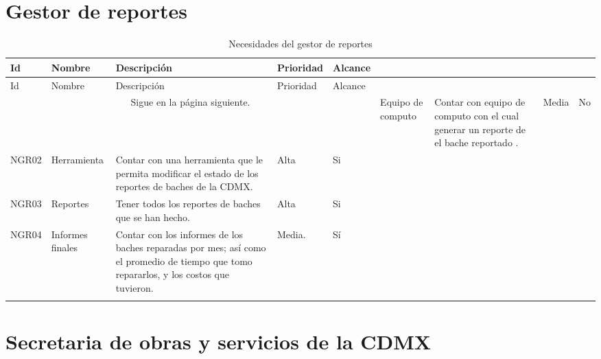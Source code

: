\section {Gestor de reportes} 
\begin{longtable}{|m{1.5cm}|m{3cm}|m{5cm}|m{2cm}| m{2cm}|}\rowcolor[HTML]{3531FF} 
        {\color[HTML]{FFFFFF} Id} &{\color[HTML]{FFFFFF}Nombre} & {\color[HTML]{FFFFFF} Descripción} & {\color[HTML]{FFFFFF}Prioridad} & {\color[HTML]{FFFFFF}Alcance}\\
        \hline
        \endfirsthead
        \hline
        Id & Nombre & Descripción & Prioridad & Alcance  \\
        \hline 
        \endhead
        \multicolumn{5}{c}{Sigue en la página siguiente.}
        \endfoot
        \endlastfoot
        
        NGR01 & Equipo de computo & Contar con equipo de computo con el cual generar un reporte de el bache reportado . & Media  & No \\
        \hline
        NGR02 & Herramienta & Contar con una herramienta que le permita modificar el estado de los reportes de baches de la CDMX. & Alta  & Si \\ 
        \hline
        NGR03 & Reportes & Tener todos los reportes de baches que se han hecho. & Alta  & Si \\ 
        \hline
        NGR04 & Informes finales & Contar con los informes de los baches reparadas por mes; así como el promedio de tiempo que tomo repararlos, y los costos que tuvieron. & Media.  & Sí \\ 
        \hline
    \caption{Necesidades del gestor de reportes}
    \label{tab:NGRs}
\end{longtable}

\section {Secretaria de obras y servicios de la CDMX}

